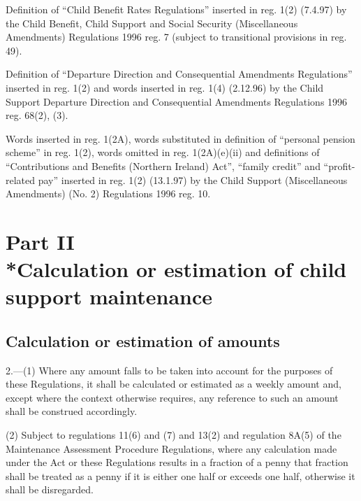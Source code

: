 \documentclass[12pt,a4paper]{article}
\begin{document}
{Definition of ``Child Benefit Rates Regulations'' inserted in reg. 1(2) (7.4.97) by the Child Benefit, Child Support and Social Security (Miscellaneous Amendments) Regulations 1996 reg. 7 (subject to transitional provisions in reg. 49).

Definition of ``Departure Direction and Consequential Amendments Regulations'' inserted in reg. 1(2) and words inserted in reg. 1(4) (2.12.96) by the Child Support Departure Direction and Consequential Amendments Regulations 1996 reg. 68(2), (3).

Words inserted in reg. 1(2A), words substituted in definition of ``personal pension scheme'' in reg. 1(2), words omitted in reg. 1(2A)(e)(ii) and definitions of ``Contributions and Benefits (Northern Ireland) Act'', ``family credit'' and ``profit-related pay'' inserted in reg. 1(2) (13.1.97) by the Child Support (Miscellaneous Amendments) (No. 2) Regulations 1996 reg. 10.
}

\section[Part II --- Calculation or estimation of child support maintenance]{\sloppy Part II\\*Calculation or estimation of child support maintenance}

\renewcommand\parthead{--- Part II}

\subsection[2. Calculation or estimation of amounts]{Calculation or estimation of amounts}

2.—(1) Where any amount falls to be taken into account for the purposes of these Regulations, it shall be calculated or estimated as a weekly amount and, except where the context otherwise requires, any reference to such an amount shall be construed accordingly.

(2) Subject to 
regulations 11(6) and (7) and 13(2) and 
  regulation 8A(5)  %
of the Maintenance Assessment Procedure Regulations,  %
where any calculation made under 
the Act or  %
these Regulations results in a fraction of a penny that fraction shall be treated as a penny if it is either one half or exceeds one half, otherwise it shall be disregarded.
\end{document}
